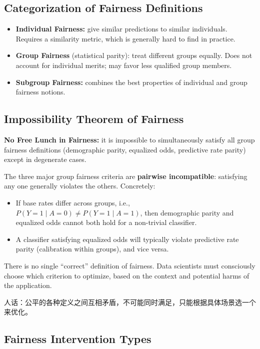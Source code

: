 \documentclass[UTF8]{ctexart}
\begin{document}
\subsection{Categorization of Fairness Definitions}
\begin{itemize}
    \item \textbf{Individual Fairness:} give similar predictions to similar individuals. Requires a similarity metric, which is generally hard to find in practice.
    \item \textbf{Group Fairness} (statistical parity): treat different groups equally. Does not account for individual merits; may favor less qualified group members.
    \item \textbf{Subgroup Fairness:} combines the best properties of individual and group fairness notions.
\end{itemize}

\subsection{Impossibility Theorem of Fairness}

\textbf{No Free Lunch in Fairness:} it is impossible to simultaneously satisfy all group fairness definitions (demographic parity, equalized odds, predictive rate parity) except in degenerate cases.

The three major group fairness criteria are \textbf{pairwise incompatible}: satisfying any one generally violates the others. Concretely:
\begin{itemize}
    \item If base rates differ across groups, i.e., $P(Y=1 \mid A=0) \neq P(Y=1 \mid A=1)$, then demographic parity and equalized odds cannot both hold for a non-trivial classifier.
    \item A classifier satisfying equalized odds will typically violate predictive rate parity (calibration within groups), and vice versa.
\end{itemize}

There is no single ``correct'' definition of fairness. Data scientists must consciously choose which criterion to optimize, based on the context and potential harms of the application.

人话：公平的各种定义之间互相矛盾，不可能同时满足，只能根据具体场景选一个来优化。

\subsection{Fairness Intervention Types}
\end{document}
